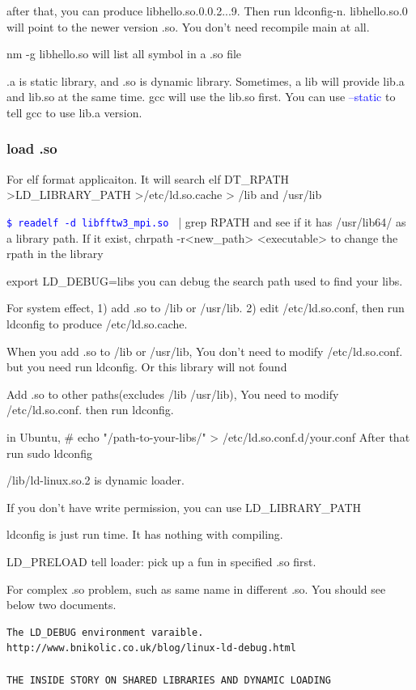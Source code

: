 \documentclass[paper=8.5in:11in, twoside, 12pt, pagesize=pdftex]{book}
\newcommand{\linuxcommand}[1]{\texttt{\textcolor{blue}{\$ #1 \Pisymbol{psy}{191}}}}
\newcommand{\op}[1]{\textcolor{blue}{-#1}}
\begin{document}
		after that, you can produce libhello.so.0.0.2...9. Then run ldconfig-n. libhello.so.0 will point to the newer version .so. You don't need recompile main at all.  

		nm -g libhello.so will list all symbol in a .so file
		
		.a is static library, and .so is dynamic library. Sometimes, a lib will provide lib.a and lib.so at the same time. gcc will use the lib.so first. You can use \op{-static} to tell gcc to use lib.a version.

\subsubsection{load .so}	
	For elf format applicaiton. It will search elf DT\_RPATH >LD\_LIBRARY\_PATH >/etc/ld.so.cache > /lib and /usr/lib

	\linuxcommand{readelf -d libfftw3\_mpi.so} | grep RPATH and see if it has /usr/lib64/ as a library path. If it exist, chrpath -r<new\_path> <executable> to change the rpath in the library 

	export LD\_DEBUG=libs you can debug the search path used to find your libs.

	For system effect, 1) add .so to /lib or /usr/lib. 2) edit /etc/ld.so.conf, then run ldconfig to produce /etc/ld.so.cache.

	When you add .so to /lib or /usr/lib, You don't need to modify /etc/ld.so.conf. but you need run ldconfig.  Or this library will not found 

	Add .so to other paths(excludes /lib /usr/lib), You need to modify /etc/ld.so.conf. then run ldconfig. 
				
	in Ubuntu, \# echo "/path-to-your-libs/" > /etc/ld.so.conf.d/your.conf After that run sudo ldconfig
						
	/lib/ld-linux.so.2 is dynamic loader. 

	If you don't have write permission, you can use LD\_LIBRARY\_PATH

	ldconfig is just run time. It has nothing with compiling. 

	LD\_PRELOAD tell loader: pick up a fun in specified .so first. 

	For complex .so problem, such as same name in different .so.  You should see below two documents. 

\begin{lstlisting}
The LD_DEBUG environment varaible.
http://www.bnikolic.co.uk/blog/linux-ld-debug.html	

THE INSIDE STORY ON SHARED LIBRARIES AND DYNAMIC LOADING			
\end{lstlisting}			
  	 
\end{document}
